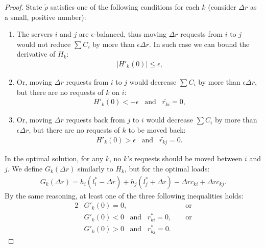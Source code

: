 \documentclass[11pt]{article}
\begin{document}
\begin{proof}
State $\tilde{\rho}$ satisfies one of the following conditions for each $k$ (consider $\Delta r$ as a small, positive number):
\begin{enumerate}
\item The servers $i$ and $j$ are $\epsilon$-balanced, thus moving $\Delta r$ requests from $i$ to $j$ would not reduce $\sum C_i$ by more than $\epsilon \Delta r$. In such case we can bound the derivative of $H_k$:
\begin{align}
|H'_k(0)| \leq \epsilon \label{ineq:convergence1} \textrm{,}
\end{align}
\item Or, moving $\Delta r$ requests from $i$ to $j$ would decrease $\sum C_i$ by more than $\epsilon \Delta r$, but there are no requests of $k$ on $i$:
\begin{align}
H'_k(0) < -\epsilon \;\;\; \mathrm{and}\;\;\; \tilde{r_{ki}} = 0  \label{ineq:convergence2} \textrm{,}
\end{align}
\item Or, moving $\Delta r$ requests back from $j$ to $i$ would decrease $\sum C_i$ by more than $\epsilon \Delta r$, but there are no requests of $k$ to be moved back:
\begin{align}
H'_k(0) > \epsilon \;\;\; \mathrm{and}\;\;\; \tilde{r_{kj}} = 0  \label{ineq:convergence3} \textrm{.}
\end{align}
\end{enumerate}

In the optimal solution, for any $k$, no $k$'s requests should be moved between $i$ and $j$. We define $G_k(\Delta r)$ similarly to $H_k$, but for the optimal loads:
\begin{align}
G_k(\Delta r) = h_i(l^{*}_i - \Delta r) + h_j(l^{*}_j + \Delta r) - \Delta r c_{ki} + \Delta r c_{kj} \textrm{.}
\end{align}
By the same reasoning, at least one of the three following inequalities holds:
\begin{alignat}{2}
& G'_k(0) = 0 \text{,} \ & \ & \text{or} \label{ineq:convergence4} \\
& G'_k(0) < 0 \;\;\; \mathrm{and}\;\;\; r^{*}_{ki} = 0 \text{,} \ & \ & \text{or} \label{ineq:convergence5} \\
& G'_k(0) > 0 \;\;\; \mathrm{and}\;\;\; r^{*}_{kj} = 0 \text{.} \ & \ &  \label{ineq:convergence6}
\end{alignat}




\end{proof}
\end{document}
